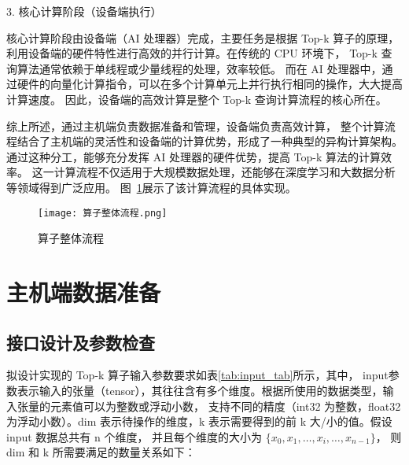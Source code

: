 3. 核心计算阶段（设备端执行）

核心计算阶段由设备端（AI 处理器）完成，主要任务是根据 Top-k 算子的原理，
利用设备端的硬件特性进行高效的并行计算。在传统的 CPU 环境下，
Top-k 查询算法通常依赖于单线程或少量线程的处理，效率较低。
而在 AI 处理器中，通过硬件的向量化计算指令，可以在多个计算单元上并行执行相同的操作，大大提高计算速度。
因此，设备端的高效计算是整个 Top-k 查询计算流程的核心所在。


综上所述，通过主机端负责数据准备和管理，设备端负责高效计算，
整个计算流程结合了主机端的灵活性和设备端的计算优势，形成了一种典型的异构计算架构。
通过这种分工，能够充分发挥 AI 处理器的硬件优势，提高 Top-k 算法的计算效率。
这一计算流程不仅适用于大规模数据处理，还能够在深度学习和大数据分析等领域得到广泛应用。
图~\ref{fig:topk}展示了该计算流程的具体实现。
\begin{figure}[ht]
    \centering
    \texttt{[image: 算子整体流程.png]}
    \caption{算子整体流程}
    \label{fig:topk}
\end{figure}




\section{主机端数据准备}
    \subsection{接口设计及参数检查}
    拟设计实现的 Top-k 算子输入参数要求如表\ref{tab:input_tab}所示，其中，
    input参数表示输入的张量（tensor），其往往含有多个维度。根据所使用的数据类型，输入张量的元素值可以为整数或浮动小数，
    支持不同的精度（int32 为整数，float32 为浮动小数）。dim 表示待操作的维度，k 表示需要得到的前 k 大/小的值。假设 input 数据总共有 n 个维度，
    并且每个维度的大小为 $\{ x_{0}, x_{1}, \dots, x_{i}, \dots, x_{n-1} \}$，
    则 dim 和 k 所需要满足的数量关系如下：

